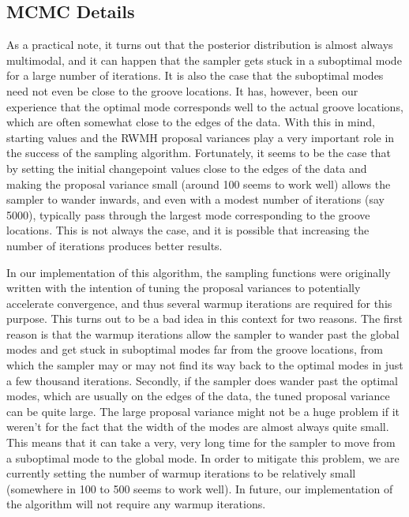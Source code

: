 \documentclass[12pt]{article}
\begin{document}
\subsection{MCMC Details}

As a practical note, it turns out that the posterior distribution is
almost always multimodal, and it can happen that the sampler gets stuck
in a suboptimal mode for a large number of iterations. It is also the
case that the suboptimal modes need not even be close to the groove
locations. It has, however, been our experience that the optimal mode
corresponds well to the actual groove locations, which are often
somewhat close to the edges of the data. With this in mind, starting
values and the RWMH proposal variances play a very important role in the
success of the sampling algorithm. Fortunately, it seems to be the case
that by setting the initial changepoint values close to the edges of the
data and making the proposal variance small (around 100 seems to work
well) allows the sampler to wander inwards, and even with a modest
number of iterations (say 5000), typically pass through the largest mode
corresponding to the groove locations. This is not always the case, and
it is possible that increasing the number of iterations produces better
results.

In our implementation of this algorithm, the sampling functions were
originally written with the intention of tuning the proposal variances
to potentially accelerate convergence, and thus several warmup
iterations are required for this purpose. This turns out to be a bad
idea in this context for two reasons. The first reason is that the
warmup iterations allow the sampler to wander past the global modes and
get stuck in suboptimal modes far from the groove locations, from which
the sampler may or may not find its way back to the optimal modes in
just a few thousand iterations. Secondly, if the sampler does wander
past the optimal modes, which are usually on the edges of the data, the
tuned proposal variance can be quite large. The large proposal variance
might not be a huge problem if it weren't for the fact that the width of
the modes are almost always quite small. This means that it can take a
very, very long time for the sampler to move from a suboptimal mode to
the global mode. In order to mitigate this problem, we are currently
setting the number of warmup iterations to be relatively small
(somewhere in 100 to 500 seems to work well). In future, our
implementation of the algorithm will not require any warmup iterations.
\end{document}
